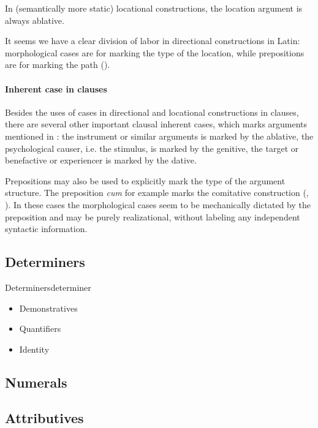 \documentclass[a4paper, oneside, 12pt]{report}
\newcommand{\form}[1]{\emph{#1}}
\begin{document}
In (semantically more static) locational constructions,
the location argument is always ablative.

It seems we have a clear division of labor in directional constructions in Latin:
morphological cases are for marking the type of the location,
while prepositions are for marking the path
().

\paragraph*{Inherent case in clauses}
Besides the uses of cases in directional and locational constructions in clauses,
there are several other important clausal inherent cases,
which marks arguments mentioned in :
the instrument or similar arguments is marked by the ablative,
the psychological causer, i.e. the stimulus, is marked by the genitive,
the target or benefactive or experiencer is marked by the dative.

Prepositions may also be used to explicitly mark the type of the argument structure.
The preposition \form{cum} for example marks the comitative construction
(,
).
In these cases the morphological cases seem to be mechanically dictated by the preposition
and may be purely realizational, without labeling any independent syntactic information.

\subsection{Determiners}\label{sec:grammatical.np.determiner}

\begin{todobox}{Determiners}{determiner}
    \begin{itemize}
        \item Demonstratives
        \item Quantifiers
        \item Identity
    \end{itemize}
\end{todobox}

\subsection{Numerals}

\subsection{Attributives}
\end{document}
